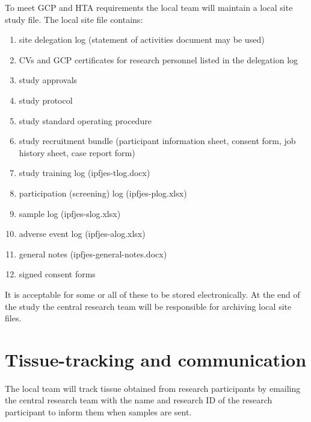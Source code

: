 \documentclass[a4paper,10pt]{article}
\begin{document}
To meet GCP and HTA requirements the local team will maintain a local site study file. The local site file contains:

 \begin{enumerate}
     \item site delegation log (statement of activities document may be used)
     \item CVs and GCP certificates for research personnel listed in the delegation log
     \item study approvals
     \item study protocol 
     \item study standard operating procedure 
     \item study recruitment bundle (participant information sheet, consent form, job history sheet, case report form)
     \item study training log (ipfjes-tlog.docx)
     \item participation (screening) log (ipfjes-plog.xlsx)
     \item sample log (ipfjes-slog.xlsx)
     \item adverse event log (ipfjes-alog.xlsx)
     \item general notes (ipfjes-general-notes.docx)
     \item signed consent forms
 \end{enumerate}


It is acceptable for some or all of these to be stored electronically. At the end of the study the central research team will be responsible for archiving local site files.


\section{Tissue-tracking and communication}

The local team will track tissue obtained from research participants by emailing the central research team with the name and research ID of the research participant to inform them when samples are sent.
\end{document}
